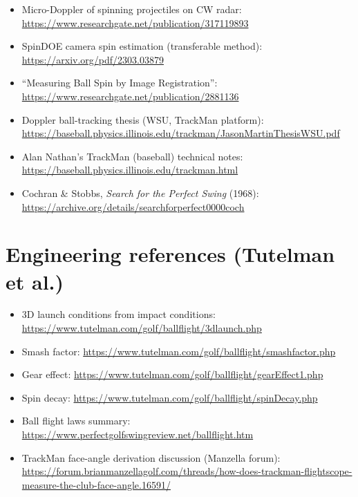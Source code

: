 \begin{itemize}
  \url{https://www.mdpi.com/2504-3900/2/6/238}
\item Micro-Doppler of spinning projectiles on CW radar:
  \url{https://www.researchgate.net/publication/317119893}
\item SpinDOE camera spin estimation (transferable method):
  \url{https://arxiv.org/pdf/2303.03879}
\item ``Measuring Ball Spin by Image Registration'':
  \url{https://www.researchgate.net/publication/2881136}
\item Doppler ball-tracking thesis (WSU, TrackMan platform):
  \url{https://baseball.physics.illinois.edu/trackman/JasonMartinThesisWSU.pdf}
\item Alan Nathan's TrackMan (baseball) technical notes:
  \url{https://baseball.physics.illinois.edu/trackman.html}
\item Cochran \& Stobbs, \emph{Search for the Perfect Swing} (1968):
  \url{https://archive.org/details/searchforperfect0000coch}
\end{itemize}

\section{Engineering references (Tutelman et al.)}
\begin{itemize}\small
\item 3D launch conditions from impact conditions:
  \url{https://www.tutelman.com/golf/ballflight/3dlaunch.php}
\item Smash factor: \url{https://www.tutelman.com/golf/ballflight/smashfactor.php}
\item Gear effect: \url{https://www.tutelman.com/golf/ballflight/gearEffect1.php}
\item Spin decay: \url{https://www.tutelman.com/golf/ballflight/spinDecay.php}
\item Ball flight laws summary:
  \url{https://www.perfectgolfswingreview.net/ballflight.htm}
\item TrackMan face-angle derivation discussion (Manzella forum):
  \url{https://forum.brianmanzellagolf.com/threads/how-does-trackman-flightscope-measure-the-club-face-angle.16591/}
\end{itemize}

